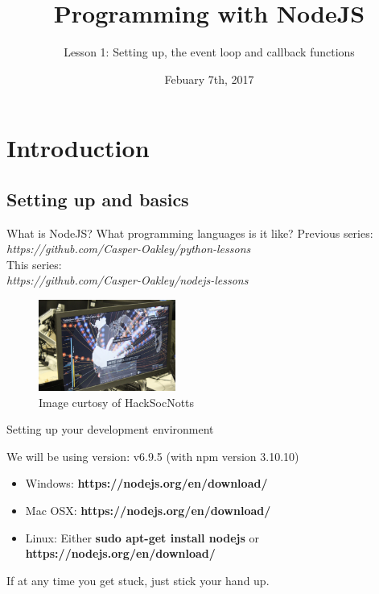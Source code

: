 \documentclass{beamer}
\title{Programming with NodeJS}
\subtitle{Lesson 1: Setting up, the event loop and callback functions}
\date{Febuary 7th, 2017}
\begin{document}
\begin{frame}
  \titlepage
\end{frame}


\section{Introduction}

\subsection{Setting up and basics}

\begin{frame}{What is NodeJS? What programming languages is it like?}
\pause
Previous series:\\
\pause
\textit{https://github.com/Casper-Oakley/python-lessons}\\
\pause
This series:\\
\pause
\textit{https://github.com/Casper-Oakley/nodejs-lessons}
\pause
\begin{figure}[h]
\includegraphics[width=0.4\textwidth]{wow}
\caption{Image curtosy of HackSocNotts}
\end{figure}
\end{frame}

\begin{frame}{Setting up your development environment}

We will be using  version: v6.9.5 (with npm version 3.10.10)

\begin{itemize}
  \item {
    Windows: \textbf{https://nodejs.org/en/download/}
  }
  \item {
    Mac OSX: \textbf{https://nodejs.org/en/download/}
  }
  \item {
    Linux: Either \textbf{sudo apt-get install nodejs} or \textbf{https://nodejs.org/en/download/}
  }
\end{itemize}

If at any time you get stuck, just stick your hand up.

\end{frame}
\end{document}
